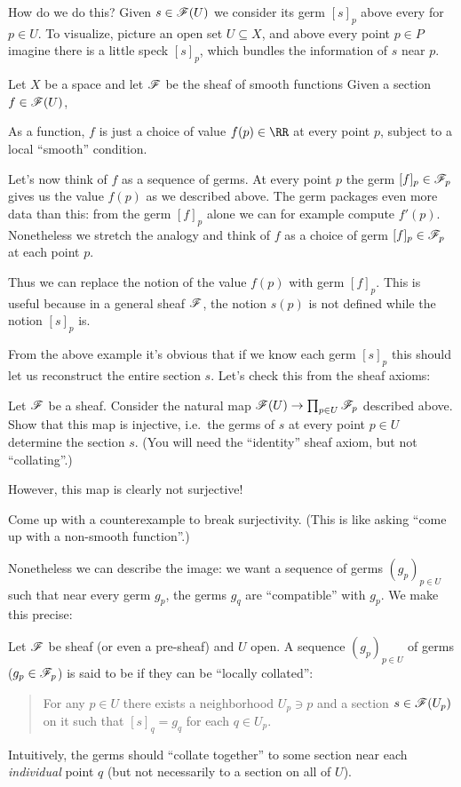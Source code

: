 How do we do this?
Given $s \in \mathscr F(U)$ we consider its germ $[s]_p$ above every for $p \in U$.
To visualize, picture an open set $U \subseteq X$,
and above every point $p \in P$ imagine there is a little speck $[s]_p$,
which bundles the information of $s$ near $p$.
\begin{example}
	Let $X$ be a space and let $\mathscr F$ be the sheaf of smooth functions 
	Given a section $f \in \mathscr F(U)$,
	\begin{itemize}
		\ii As a function, $f$ is just a choice of value $f(p) \in \RR$ at
		every point $p$, subject to a local ``smooth'' condition.

		\ii Let's now think of $f$ as a sequence of germs.
		At every point $p$ the germ $[f]_p \in \mathscr F_p$ gives us the value $f(p)$
		as we described above. The germ packages even more data than this:
		from the germ $[f]_p$ alone we can for example compute $f'(p)$.
		Nonetheless we stretch the analogy and think of $f$
		as a choice of germ $[f]_p \in \mathscr F_p$ at each point $p$.
	\end{itemize}
	Thus we can replace the notion of the value $f(p)$ with germ $[f]_p$.
	This is useful because in a general sheaf $\mathscr F$, the notion $s(p)$
	is not defined while the notion $[s]_p$ is.
\end{example}

From the above example it's obvious that if we know each germ $[s]_p$
this should let us reconstruct the entire section $s$.
Let's check this from the sheaf axioms:
\begin{exercise}
	Let $\mathscr F$ be a sheaf.
	Consider the natural map $\mathscr F(U) \to \prod_{p \in U} \mathscr F_p$ described above.
	Show that this map is injective, i.e.\
	the germs of $s$ at every point $p \in U$ determine the section $s$.
	(You will need the ``identity'' sheaf axiom, but not ``collating''.)
\end{exercise}

However, this map is clearly not surjective!
\begin{ques}
	Come up with a counterexample to break surjectivity.
	(This is like asking ``come up with a non-smooth function''.)
\end{ques}
Nonetheless we can describe the image:
we want a sequence of germs $(g_p)_{p \in U}$ such that near every germ $g_p$,
the germs $g_q$ are ``compatible'' with $g_p$.
We make this precise:
\begin{definition}
	Let $\mathscr F$ be sheaf (or even a pre-sheaf) and $U$ open.
	A sequence $(g_p)_{p \in U}$ of germs
	($g_p \in \mathscr F_p$) is said to be  if
	they can be ``locally collated'':
	\begin{quote}
		For any $p \in U$ there exists a neighborhood $U_p \ni p$
		and a section $s \in \mathscr F(U_p)$ on it
		such that $[s]_q = g_q$ for each $q \in U_p$.
	\end{quote}
	Intuitively, the germs should ``collate together'' to some section near
	each \emph{individual} point $q$
	(but not necessarily to a section on all of $U$).
\end{definition}

